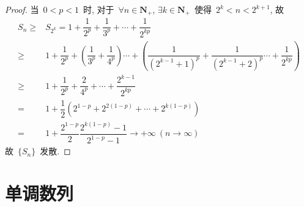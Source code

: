\documentclass[UTF8,a4paper,11pt,twoside]{book}
\begin{document}
\begin{enumerate}
\begin{proof}
		      当~$0<p<1$~时, 对于~$\forall n\in\mathbf{N}_{+}$, $\exists k\in\mathbf{N}_{+}$~使得~$2^k<n<2^{k+1}$, 故
		      \begin{equation*}
			      \begin{split}
				      S_n\geqslant & S_{2^k}=1+\dfrac{1}{2^p}+\dfrac{1}{3^p}+\cdots+\dfrac{1}{2^{kp}}                                                                                         \\
				      \geqslant        & 1+\dfrac{1}{2^p}+\left(\dfrac{1}{3^p}+\dfrac{1}{4^p}\right)\cdots+\left(\dfrac{1}{(2^{k-1}+1)^p}+\dfrac{1}{(2^{k-1}+2)^p}\cdots+\dfrac{1}{2^{kp}}\right) \\
				      \geqslant        & 1+\dfrac{1}{2^p}+\dfrac{2}{4^p}+\cdots+\dfrac{2^{k-1}}{2^{kp}}                                                                                           \\
				      =                & 1+\dfrac{1}{2}(2^{1-p}+2^{2(1-p)}+\cdots+2^{k(1-p)})                                                                                                     \\
				      =                & 1+\dfrac{2^{1-p}}{2}\dfrac{2^{k(1-p)}-1}{2^{1-p}-1}\to+\infty\ (n\to\infty)
			      \end{split}
		      \end{equation*}
		      故~$\{S_n\}$~发散.\qedhere
	      \end{proof}
\end{enumerate}

\section{单调数列}
\end{document}
